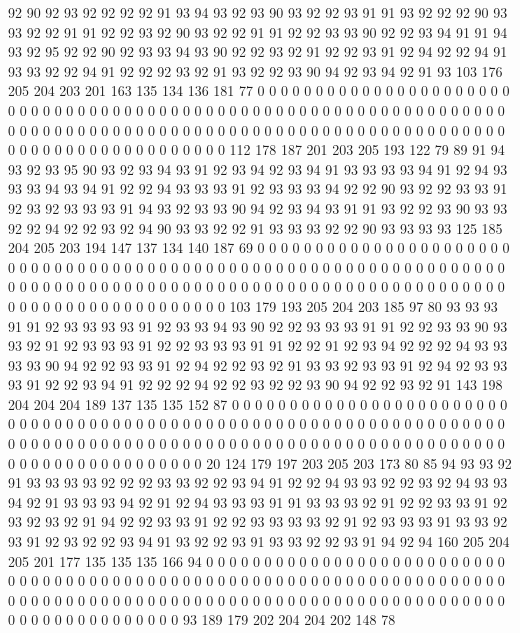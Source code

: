 92 90 92 93 92 92 92 92 91 93 94 93 92 93 90 93 92 92 93 91
91 93 92 92 92 90 93 93 92 92 91 91 92 92 93 92 90 93 92 92
91 91 92 92 93 93 90 92 92 93 94 91 91 94 93 92 95 92 92 90
92 93 93 94 93 90 92 92 93 92 91 92 92 93 91 92 94 92 92 94
91 93 93 92 92 94 91 92 92 92 93 92 91 93 92 92 93 90 94 92
93 94 92 91 93 103 176 205 204 203 201 163 135 134 136 181 77 0 0 0
0 0 0 0 0 0 0 0 0 0 0 0 0 0 0 0 0 0 0 0
0 0 0 0 0 0 0 0 0 0 0 0 0 0 0 0 0 0 0 0
0 0 0 0 0 0 0 0 0 0 0 0 0 0 0 0 0 0 0 0
0 0 0 0 0 0 0 0 0 0 0 0 0 0 0 0 0 0 0 0
0 0 0 0 0 0 0 0 0 0 0 0 0 0 0 0 0 0 0 0
0 0 0 0 0 0 0 0 0 0 0 0 0 0 0 0 0 0 0 0
0 0 0 0 112 178 187 201 203 205 193 122 79 89 91 94 93 92 93 95
90 93 92 93 94 93 91 92 93 94 92 93 94 91 93 93 93 93 94 91
92 94 93 93 93 94 93 94 91 92 92 94 93 93 93 91 92 93 93 93
94 92 92 90 93 92 92 93 93 91 92 93 92 93 93 93 91 94 93 92
93 93 90 94 92 93 94 93 91 91 93 92 92 93 90 93 93 92 92 94
92 92 93 92 94 90 93 93 92 92 91 93 93 93 92 92 90 93 93 93
93 125 185 204 205 203 194 147 137 134 140 187 69 0 0 0 0 0 0 0
0 0 0 0 0 0 0 0 0 0 0 0 0 0 0 0 0 0 0 0
0 0 0 0 0 0 0 0 0 0 0 0 0 0 0 0 0 0 0 0
0 0 0 0 0 0 0 0 0 0 0 0 0 0 0 0 0 0 0 0
0 0 0 0 0 0 0 0 0 0 0 0 0 0 0 0 0 0 0 0
0 0 0 0 0 0 0 0 0 0 0 0 0 0 0 0 0 0 0 0
0 0 0 0 0 0 0 0 0 0 0 0 0 0 0 0 0 0 0 0
103 179 193 205 204 203 185 97 80 93 93 93 91 91 92 93 93 93 93 91
92 93 93 94 93 90 92 92 93 93 93 91 91 92 92 93 93 90 93 93
92 91 92 93 93 93 91 92 92 93 93 93 91 91 92 92 91 92 93 94
92 92 92 94 93 93 93 93 90 94 92 92 93 93 91 92 94 92 92 93
92 91 93 93 92 93 93 91 92 94 92 93 93 93 91 92 92 93 94 91
92 92 92 94 92 92 93 92 92 93 90 94 92 92 93 92 91 143 198 204
204 204 189 137 135 135 152 87 0 0 0 0 0 0 0 0 0 0 0 0
0 0 0 0 0 0 0 0 0 0 0 0 0 0 0 0 0 0 0 0
0 0 0 0 0 0 0 0 0 0 0 0 0 0 0 0 0 0 0 0
0 0 0 0 0 0 0 0 0 0 0 0 0 0 0 0 0 0 0 0
0 0 0 0 0 0 0 0 0 0 0 0 0 0 0 0 0 0 0 0
0 0 0 0 0 0 0 0 0 0 0 0 0 0 0 0 0 0 0 0
0 0 0 0 0 0 0 0 0 0 0 0 0 0 0 20 124 179 197 203
205 203 173 80 85 94 93 93 92 91 93 93 93 93 92 92 92 93 93 92
92 93 94 91 92 92 94 93 93 92 92 93 92 94 93 93 94 92 91 93
93 93 94 92 91 92 94 93 93 93 91 91 93 93 93 92 91 92 92 93
93 91 92 93 92 93 92 91 94 92 92 93 93 91 92 92 93 93 93 93
92 91 92 93 93 93 91 93 93 92 93 91 92 93 92 92 93 94 91 93
92 92 93 91 93 93 92 92 93 91 94 92 94 160 205 204 205 201 177 135
135 135 166 94 0 0 0 0 0 0 0 0 0 0 0 0 0 0 0 0
0 0 0 0 0 0 0 0 0 0 0 0 0 0 0 0 0 0 0 0
0 0 0 0 0 0 0 0 0 0 0 0 0 0 0 0 0 0 0 0
0 0 0 0 0 0 0 0 0 0 0 0 0 0 0 0 0 0 0 0
0 0 0 0 0 0 0 0 0 0 0 0 0 0 0 0 0 0 0 0
0 0 0 0 0 0 0 0 0 0 0 0 0 0 0 0 0 0 0 0
0 0 0 0 0 0 0 0 0 0 0 93 189 179 202 204 204 202 148 78
